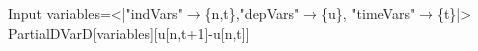 \begin{mmaCell}[moredefined={variables, expression, PartialDVarD}]{Input}
  variables=<|"indVars"\(\pmb{\to}\)\{n,t\},"depVars"\(\pmb{\to}\)\{u\},
  "timeVars"\(\pmb{\to}\)\{t\}|>
  PartialDVarD[variables][u[n,t+1]-u[n,t]]
  
\end{mmaCell}